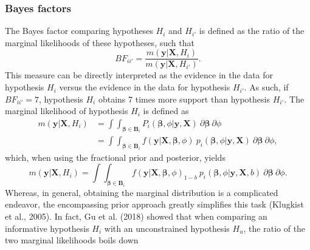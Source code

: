 \documentclass[
]{interact}
\begin{document}
\hypertarget{bayes-factors}{%
\subsubsection{Bayes factors}\label{bayes-factors}}

The Bayes factor comparing hypotheses \(H_i\) and \(H_{i'}\) is defined
as the ratio of the marginal likelihoods of these hypotheses, such that
\[
BF_{ii'} = \frac{m(\boldsymbol{y} | \boldsymbol{X}, H_i)}{m(\boldsymbol{y} | \boldsymbol{X}, H_{i'})}.
\] This measure can be directly interpreted as the evidence in the data
for hypothesis \(H_i\) versus the evidence in the data for hypothesis
\(H_{i'}\). As such, if \(BF_{ii'} = 7\), hypothesis \(H_i\) obtains 7
times more support than hypothesis \(H_{i'}\). The marginal likelihood
of hypothesis \(H_i\) is defined as \[
\begin{aligned}
m(\boldsymbol{y} | \boldsymbol{X}, H_i) 
&= \int \int_{\boldsymbol{\beta} \in \boldsymbol{B}_i}  P_i(\boldsymbol{\beta}, \phi | \boldsymbol{y}, \boldsymbol{X}) ~ \partial \boldsymbol{\beta} ~ \partial \phi \\
&= \int \int_{\boldsymbol{\beta} \in \boldsymbol{B}_i} f(\boldsymbol{y} | \boldsymbol{X}, \boldsymbol{\beta}, \phi) ~ p_i(\boldsymbol{\beta}, \phi | \boldsymbol{y}, \boldsymbol{X}) ~ \partial \boldsymbol{\beta} ~ \partial \phi,
\end{aligned}
\] which, when using the fractional prior and posterior, yields \[
m(\boldsymbol{y} | \boldsymbol{X}, H_i) = 
  \int \int_{\boldsymbol{\beta} \in \boldsymbol{B}_i}  
  f(\boldsymbol{y} | \boldsymbol{X}, \boldsymbol{\beta}, \phi)_{1-b} ~ 
  p_i(\boldsymbol{\beta}, \phi | \boldsymbol{y}, \boldsymbol{X}, b) ~ \partial \boldsymbol{\beta} ~ \partial \phi.
\] Whereas, in general, obtaining the marginal distribution is a
complicated endeavor, the encompassing prior approach greatly simplifies
this task (Klugkist et al., 2005). In fact, Gu et al. (2018) showed that
when comparing an informative hypothesis \(H_i\) with an unconstrained
hypothesis \(H_u\), the ratio of the two marginal likelihoods boils down
\end{document}
